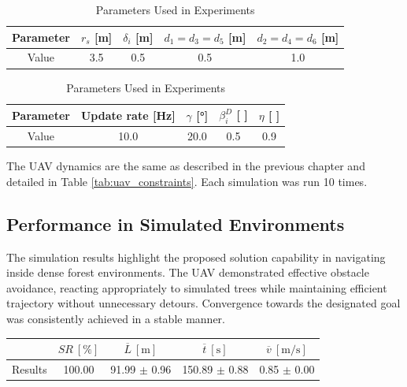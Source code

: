             \begin{table}[H]
                \centering
                \caption{Parameters Used in Experiments}
                
                \begin{tabular}{|c|c|c|c|c|}
                    \hline
                    Parameter & $r_s$ [m]  & $\delta_i$ [m] & $d_1 = d_3 = d_5$ [m] & $d_2 = d_4 = d_6$ [m]   \\ \hline
                    Value & 3.5 & 0.5 & 0.5 & 1.0 \\ \hline
                \end{tabular}
                
                \vspace{0.3cm}
                
                \begin{tabular}{|c|c|c|c|c|}
                    \hline
                    Parameter & Update rate [Hz] & $\gamma$ [°] & $\beta_i^D$ [ ] & $\eta$ [ ] \\ \hline
                    Value & 10.0 & 20.0 & 0.5 & 0.9 \\ \hline
                \end{tabular}
                
                \label{tab:rbl_forest_simulation_parameters}
            \end{table}
            
            The \ac{UAV} dynamics are the same as described in the previous chapter and detailed in Table \ref{tab:uav_constraints}. 
            Each simulation was run 10 times.            

        \subsection{Performance in Simulated Environments}
            The simulation results highlight the proposed solution capability in navigating inside dense forest environments. 
            The \ac{UAV} demonstrated effective obstacle avoidance, reacting appropriately to simulated trees while maintaining efficient trajectory without unnecessary detours.
            Convergence towards the designated goal was consistently achieved in a stable manner.

            \begin{table}[H]
                \centering
                \renewcommand{\arraystretch}{1.2}
                \begin{tabular}{|c|c|c|c|c|}
                \hline
                                                  & \( SR \ [\%] \) & \( \overline{L} \ [\mathrm{m}] \) & \( \overline{t} \ [\mathrm{s}] \) &  \( \overline{v} \ [\mathrm{m/s}] \)     \\ \hline
                Results                           & 100.00          & 91.99 $\pm$ 0.96                  & 150.89 $\pm$ 0.88                  &  0.85 $\pm$ 0.00                         \\ \hline
                \end{tabular}
            \end{table}

